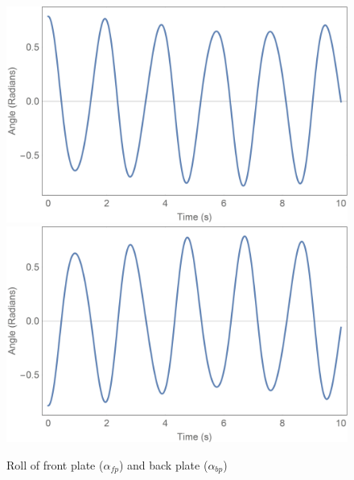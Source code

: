 \begin{figure}[!htb]
	\centering
	\includegraphics[width=\linewidth]{alphafp}
	\endminipage\hspace{1em}%
	\includegraphics[width=\linewidth]{alphabp}
	\endminipage
	\caption{Roll of front plate ($\alpha_{fp}$) and back plate ($\alpha_{bp}$)}
	\label{fig:plates}
\end{figure}

